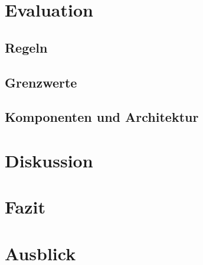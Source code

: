 \documentclass[a4paper,12pt]{scrartcl}
\begin{document}
\section{Evaluation}
\subsection{Regeln}
\subsection{Grenzwerte}
\subsection{Komponenten und Architektur}

\section{Diskussion}

\section{Fazit}

\section{Ausblick}
\end{document}
